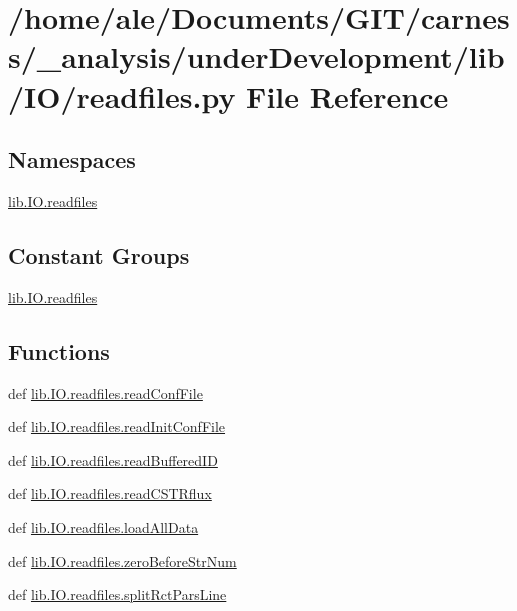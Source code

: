 \hypertarget{a00050}{\section{/home/ale/\-Documents/\-G\-I\-T/carness/\-\_\-analysis/under\-Development/lib/\-I\-O/readfiles.py File Reference}
\label{a00050}
}
\subsection*{Namespaces}
\begin{DoxyCompactItemize}
\item 
\hyperlink{a00109}{lib.\-I\-O.\-readfiles}
\end{DoxyCompactItemize}
\subsection*{Constant Groups}
\begin{DoxyCompactItemize}
\item 
\hyperlink{a00109}{lib.\-I\-O.\-readfiles}
\end{DoxyCompactItemize}
\subsection*{Functions}
\begin{DoxyCompactItemize}
\item 
def \hyperlink{a00109_aa0985f97c9159003c7a4bd44d1a989f3}{lib.\-I\-O.\-readfiles.\-read\-Conf\-File}
\item 
def \hyperlink{a00109_af8a2deca70e9e04a4c4812d81430df19}{lib.\-I\-O.\-readfiles.\-read\-Init\-Conf\-File}
\item 
def \hyperlink{a00109_a4a56e157e25982ad4a7dedd03929dcd6}{lib.\-I\-O.\-readfiles.\-read\-Buffered\-I\-D}
\item 
def \hyperlink{a00109_ab6d9ae4f9d3c52b2aad8b50d9b110dc1}{lib.\-I\-O.\-readfiles.\-read\-C\-S\-T\-Rflux}
\item 
def \hyperlink{a00109_a5ddfb684cfa43cb2aa2d8246078c486c}{lib.\-I\-O.\-readfiles.\-load\-All\-Data}
\item 
def \hyperlink{a00109_a30cdb91109c2d6ea6e0abb808fe88c6f}{lib.\-I\-O.\-readfiles.\-zero\-Before\-Str\-Num}
\item 
def \hyperlink{a00109_a3a9416927822cf24fb30e1d57bf71412}{lib.\-I\-O.\-readfiles.\-split\-Rct\-Pars\-Line}
\end{DoxyCompactItemize}
